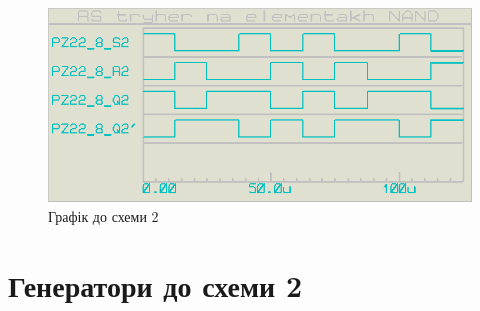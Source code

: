 \documentclass{article}
\begin{document}
\begin{normalsize}
	\begin{figure}[H]
		\centering
		\includegraphics[scale=0.25]{g2}	
		\caption{Графік до схеми 2}
	\end{figure}

	\section*{Генератори до схеми 2}
	\begin{figure}[H]
		\centering
		\hspace{5px}
	\end{figure}


\end{normalsize}
\end{document}
